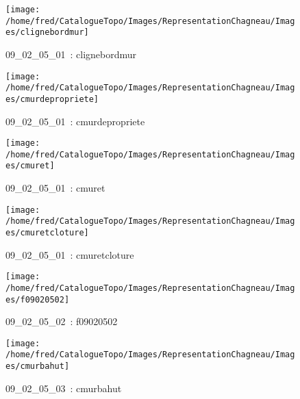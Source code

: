 \documentclass[12pt,titlepage]{book}
\begin{document}
\begin{figure}[h!]
  \hfill         %
  \begin{minipage}[t]{3cm}
    \begin{center}
      \texttt{[image: /home/fred/CatalogueTopo/Images/RepresentationChagneau/Images/clignebordmur]}
      \caption[~09\_02\_05\_01]{\small{09\_02\_05\_01~:} \tiny{clignebordmur}}\label{clignebordmur}
    \end{center}
  \end{minipage}
  \begin{minipage}[t]{3cm}
    \begin{center}
      \texttt{[image: /home/fred/CatalogueTopo/Images/RepresentationChagneau/Images/cmurdepropriete]}
      \caption[~09\_02\_05\_01]{\small{09\_02\_05\_01~:} \tiny{cmurdepropriete}}\label{cmurdepropriete}
    \end{center}
  \end{minipage}
  \begin{minipage}[t]{3cm}
    \begin{center}
      \texttt{[image: /home/fred/CatalogueTopo/Images/RepresentationChagneau/Images/cmuret]}
      \caption[~09\_02\_05\_01]{\small{09\_02\_05\_01~:} \tiny{cmuret}}\label{cmuret}
    \end{center}
  \end{minipage}
  \begin{minipage}[t]{3cm}
    \begin{center}
      \texttt{[image: /home/fred/CatalogueTopo/Images/RepresentationChagneau/Images/cmuretcloture]}
      \caption[~09\_02\_05\_01]{\small{09\_02\_05\_01~:} \tiny{cmuretcloture}}\label{cmuretcloture}
    \end{center}
  \end{minipage}
  \begin{minipage}[t]{3cm}
    \begin{center}
      \texttt{[image: /home/fred/CatalogueTopo/Images/RepresentationChagneau/Images/f09020502]}
      \caption[~09\_02\_05\_02]{\small{09\_02\_05\_02~:} \tiny{f09020502}}\label{f09020502}
    \end{center}
  \end{minipage}
  \begin{minipage}[t]{3cm}
    \begin{center}
      \texttt{[image: /home/fred/CatalogueTopo/Images/RepresentationChagneau/Images/cmurbahut]}
      \caption[~09\_02\_05\_03]{\small{09\_02\_05\_03~:} \tiny{cmurbahut}}\label{cmurbahut}
    \end{center}
  \end{minipage}
\end{figure}
\end{document}
